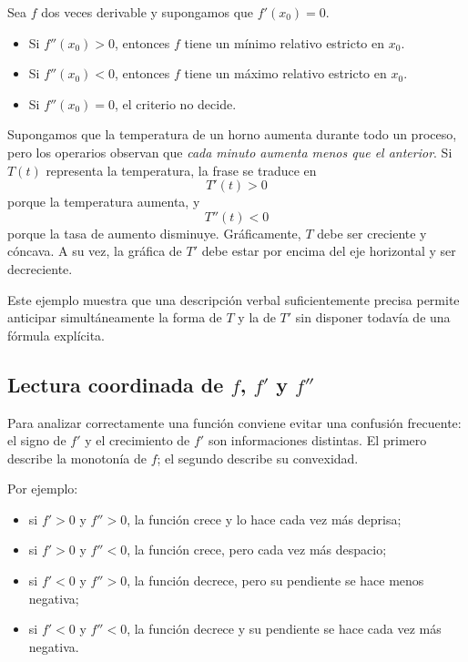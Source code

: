 \begin{theorem}
Sea $f$ dos veces derivable y supongamos que $f'(x_0)=0$.
\begin{itemize}
\item Si $f''(x_0)>0$, entonces $f$ tiene un mínimo relativo estricto en $x_0$.
\item Si $f''(x_0)<0$, entonces $f$ tiene un máximo relativo estricto en $x_0$.
\item Si $f''(x_0)=0$, el criterio no decide.
\end{itemize}
\end{theorem}

\begin{example}
Supongamos que la temperatura de un horno aumenta durante todo un proceso, pero los operarios observan que \emph{cada minuto aumenta menos que el anterior}. Si $T(t)$ representa la temperatura, la frase se traduce en
\[
T'(t)>0
\]
porque la temperatura aumenta, y
\[
T''(t)<0
\]
porque la tasa de aumento disminuye. Gráficamente, $T$ debe ser creciente y cóncava. A su vez, la gráfica de $T'$ debe estar por encima del eje horizontal y ser decreciente.

Este ejemplo muestra que una descripción verbal suficientemente precisa permite anticipar simultáneamente la forma de $T$ y la de $T'$ sin disponer todavía de una fórmula explícita.
\end{example}

\subsection{Lectura coordinada de $f$, $f'$ y $f''$}

Para analizar correctamente una función conviene evitar una confusión frecuente: el signo de $f'$ y el crecimiento de $f'$ son informaciones distintas. El primero describe la monotonía de $f$; el segundo describe su convexidad.

Por ejemplo:
\begin{itemize}
\item si $f'>0$ y $f''>0$, la función crece y lo hace cada vez más deprisa;
\item si $f'>0$ y $f''<0$, la función crece, pero cada vez más despacio;
\item si $f'<0$ y $f''>0$, la función decrece, pero su pendiente se hace menos negativa;
\item si $f'<0$ y $f''<0$, la función decrece y su pendiente se hace cada vez más negativa.
\end{itemize}

